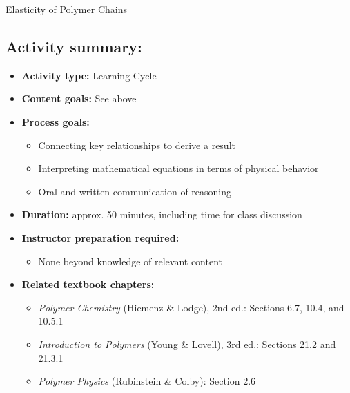 \begin{activity}{Elasticity of Polymer Chains}
\begin{instructornotes}
	\subsection*{Activity summary:}
	\begin{itemize}
		\item \textbf{Activity type:} Learning Cycle
		\item \textbf{Content goals:} See above
		\item \textbf{Process goals:} %
			\begin{itemize}
				\item Connecting key relationships to derive a result
				\item Interpreting mathematical equations in terms of physical behavior
				\item Oral and written communication of reasoning
			\end{itemize}
		\item \textbf{Duration:} approx. 50 minutes, including time for class discussion
		\item \textbf{Instructor preparation required:} 
			\begin{itemize}
				\item None beyond knowledge of relevant content
			\end{itemize}
		\item \textbf{Related textbook chapters:}
			\begin{itemize}
				\item \emph{Polymer Chemistry} (Hiemenz \& Lodge), 2nd ed.: Sections 6.7, 10.4, and 10.5.1
				\item \emph{Introduction to Polymers} (Young \& Lovell), 3rd ed.: Sections 21.2 and 21.3.1
				\item \emph{Polymer Physics} (Rubinstein \& Colby): Section 2.6
			\end{itemize}
	\end{itemize}

\end{instructornotes}


\begin{model}
\label{\labelbase:mdl:delG}


\end{model}
\end{activity}
